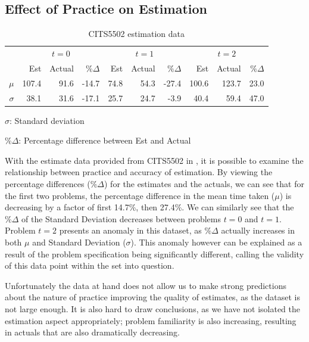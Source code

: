 \documentclass[a4paper,10pt]{article}
\begin{document}
\subsection{Effect of Practice on Estimation}
\begin{table}[b]
  \centering
  \begin{threeparttable}
  \begin{tabular}{|r|rrr|rrr|rrr|}
  \hline
 & \multicolumn{3}{|c|}{$t=0$} & \multicolumn{3}{|c|}{$t=1$} & \multicolumn{3}{|c|}{$t=2$} \\
 & Est & Actual & $\%\Delta$ & Est & Actual & $\%\Delta$ & Est & Actual & $\%\Delta$ \\ \hline
$\mu$ & 107.4 & 91.6 & -14.7 & 74.8 & 54.3 & -27.4 & 100.6 & 123.7 & 23.0 \\
$\sigma$ & 38.1 & 31.6 & -17.1 & 25.7 & 24.7 & -3.9 & 40.4 & 59.4 & 47.0 \\ \hline
  \end{tabular}
  \begin{tablenotes}
   \item $\sigma$: Standard deviation
   \item $\%\Delta$: Percentage difference between Est and Actual
  \end{tablenotes}
  \caption{CITS5502 estimation data}
  \label{tab:5502estimations}
  \end{threeparttable}
\end{table}

With the estimate data provided from CITS5502 in , it is possible to examine the relationship between practice and accuracy of estimation. By viewing the percentage differences ($\%\Delta$) for the estimates and the actuals, we can see that for the first two problems, the percentage difference in the mean time taken ($\mu$) is decreasing by a factor of first 14.7\%, then 27.4\%. We can similarly see that the $\%\Delta$ of the Standard Deviation decreases between problems $t=0$ and $t=1$. Problem $t=2$ presents an anomaly in this dataset, as $\%\Delta$ actually increases in both $\mu$ and Standard Deviation ($\sigma$). This anomaly however can be explained as a result of the problem specification being significantly different, calling the validity of this data point within the set into question.

Unfortunately the data at hand does not allow us to make strong predictions about the nature of practice improving the quality of estimates, as the dataset is not large enough. It is also hard to draw conclusions, as we have not isolated the estimation aspect appropriately; problem familiarity is also increasing, resulting in actuals that are also dramatically decreasing. 
\end{document}

